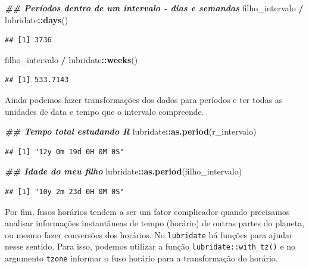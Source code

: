 \documentclass[
]{article}
\newenvironment{Shaded}{\begin{snugshade}}{\end{snugshade}}
\newcommand{\DocumentationTok}[1]{\textcolor[rgb]{0.56,0.35,0.01}{\textbf{\textit{#1}}}}
\newcommand{\FunctionTok}[1]{\textcolor[rgb]{0.13,0.29,0.53}{\textbf{#1}}}
\newcommand{\NormalTok}[1]{#1}
\newcommand{\SpecialCharTok}[1]{\textcolor[rgb]{0.81,0.36,0.00}{\textbf{#1}}}
\begin{document}
\begin{Shaded}
\begin{Highlighting}[]
\DocumentationTok{\#\# Períodos dentro de um intervalo {-} dias e semandas}
\NormalTok{filho\_intervalo }\SpecialCharTok{/}\NormalTok{ lubridate}\SpecialCharTok{::}\FunctionTok{days}\NormalTok{()}
\end{Highlighting}
\end{Shaded}

\begin{verbatim}
## [1] 3736
\end{verbatim}

\begin{Shaded}
\begin{Highlighting}[]
\NormalTok{filho\_intervalo }\SpecialCharTok{/}\NormalTok{ lubridate}\SpecialCharTok{::}\FunctionTok{weeks}\NormalTok{()}
\end{Highlighting}
\end{Shaded}

\begin{verbatim}
## [1] 533.7143
\end{verbatim}

Ainda podemos fazer transformações dos dados para períodos e ter todas as unidades de data e tempo que o intervalo compreende.

\begin{Shaded}
\begin{Highlighting}[]
\DocumentationTok{\#\# Tempo total estudando R}
\NormalTok{lubridate}\SpecialCharTok{::}\FunctionTok{as.period}\NormalTok{(r\_intervalo)}
\end{Highlighting}
\end{Shaded}

\begin{verbatim}
## [1] "12y 0m 19d 0H 0M 0S"
\end{verbatim}

\begin{Shaded}
\begin{Highlighting}[]
\DocumentationTok{\#\# Idade do meu filho}
\NormalTok{lubridate}\SpecialCharTok{::}\FunctionTok{as.period}\NormalTok{(filho\_intervalo)}
\end{Highlighting}
\end{Shaded}

\begin{verbatim}
## [1] "10y 2m 23d 0H 0M 0S"
\end{verbatim}

Por fim, fusos horários tendem a ser um fator complicador quando precisamos analisar informações instantâneas de tempo (horário) de outras partes do planeta, ou mesmo fazer conversões dos horários. No \texttt{lubridate} há funções para ajudar nesse sentido. Para isso, podemos utilizar a função \texttt{lubridate::with\_tz()} e no argumento \texttt{tzone} informar o fuso horário para a transformação do horário.
\end{document}
